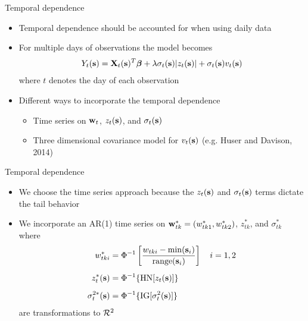 \documentclass{beamer}
\begin{document}
\begin{frame}{Temporal dependence}
  \begin{itemize} \setlength{\itemsep}{1em}
    \item Temporal dependence should be accounted for when using daily data
    \item For multiple days of observations the model becomes
      \begin{align*}
        Y_t(\mbox{\bf s}) = \mbox{\bf X}_t(\mbox{\bf s})^T \mbox{\boldmath $\beta$} + \lambda \sigma_t(\mbox{\bf s}) | z_t(\mbox{\bf s}) | + \sigma_t(\mbox{\bf s}) v_t(\mbox{\bf s})
      \end{align*}
      where $t$ denotes the day of each observation
    \item Different ways to incorporate the temporal dependence \vspace{0.5em}
    \begin{itemize} \setlength{\itemsep}{0.5em}
      \item Time series on $\mbox{\bf w}_t$, $z_t(\mbox{\bf s})$, and $\sigma_t(\mbox{\bf s})$
      \item Three dimensional covariance model for $v_t(\mbox{\bf s})$ (e.g. Huser and Davison, 2014)
    \end{itemize}
  \end{itemize}
\end{frame}

\begin{frame}{Temporal dependence}
  \begin{itemize} \setlength{\itemsep}{1em}
    \item We choose the time series approach because the $z_t(\mbox{\bf s})$ and $\sigma_t(\mbox{\bf s})$ terms dictate the tail behavior
    \item We incorporate an AR(1) time series on $\mbox{\bf w}^*_{tk} = (w^*_{tk1}, w^*_{tk2})$, $z^*_{tk}$, and $\sigma^*_{tk}$ where
    \begin{align*}
      w^*_{tki} &= \Phi^{-1}\left[ \frac{w_{tki} - \min(\mbox{\bf s}_i)}{ \text{range}(\mbox{\bf s}_i)}\right] \quad i = 1, 2 \\[0.5em]
      z^*_t(\mbox{\bf s}) &= \Phi^{-1}\{ \text{HN}[z_t(\mbox{\bf s})]\} \\[0.5em]
      \sigma^{2*}_t(\mbox{\bf s}) &= \Phi^{-1}\{ \text{IG}[\sigma^2_t(\mbox{\bf s})] \}
    \end{align*}
    are transformations to ${\cal R}^2$
  \end{itemize}
\end{frame}
\end{document}

